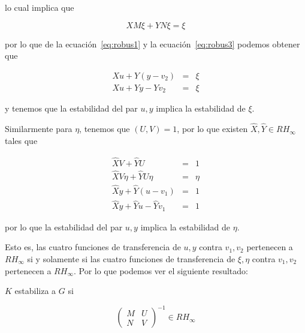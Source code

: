         lo cual implica que

        \begin{equation} \label{eq:robus3}
            X M \xi + Y N \xi = \xi
        \end{equation}

        por lo que de la ecuación~\ref{eq:robus1} y la ecuación~\ref{eq:robus3} podemos obtener que

        \begin{eqnarray}
            X u + Y (y - v_2) & = & \xi \nonumber \\
            X u + Y y - Y v_2 & = & \xi
        \end{eqnarray}

        y tenemos que la estabilidad del par $u, y$ implica la estabilidad de $\xi$.

        Similarmente para $\eta$, tenemos que $(U, V) = 1$, por lo que existen $\hat{X}, \hat{Y} \in RH_{\infty}$ tales que

        \begin{eqnarray} \label{eq:robus4}
            \hat{X} V + \hat{Y} U & = & 1 \nonumber \\
            \hat{X} V \eta + \hat{Y} U \eta & = & \eta \nonumber \\
            \hat{X} y + \hat{Y} (u - v_1) & = & 1 \nonumber \\
            \hat{X} y + \hat{Y} u - \hat{Y} v_1 & = & 1
        \end{eqnarray}

        por lo que la estabilidad del par $u, y$ implica la estabilidad de $\eta$.

        Esto es, las cuatro funciones de transferencia de $u, y$ contra $v_1, v_2$ pertenecen a $RH_{\infty}$ si y solamente si las cuatro funciones de transferencia de $\xi, \eta$ contra $v_1, v_2$ pertenecen a $RH_{\infty}$.
        Por lo que podemos ver el siguiente resultado:

        \begin{resultado}
            $K$ estabiliza a $G$ si

            \begin{equation}
                \begin{pmatrix}
                    M & U \\
                    N & V
                \end{pmatrix}^{-1} \in RH_{\infty}
            \end{equation}
        \end{resultado}

